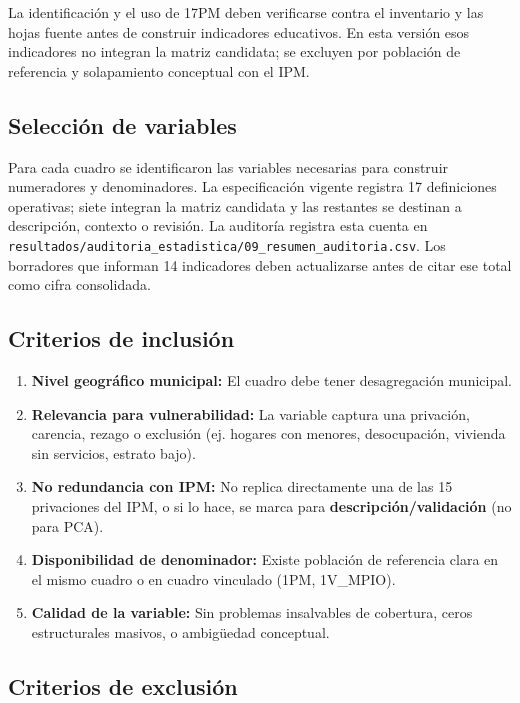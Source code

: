 \noindent * La identificación y el uso de 17PM deben verificarse contra el inventario y las hojas fuente antes de construir indicadores educativos. En esta versión esos indicadores no integran la matriz candidata; se excluyen por población de referencia y solapamiento conceptual con el IPM.

\subsection{Selección de variables}
\label{sec:seleccion_variables}

Para cada cuadro se identificaron las variables necesarias para construir numeradores y denominadores. La especificación vigente registra 17 definiciones operativas; siete integran la matriz candidata y las restantes se destinan a descripción, contexto o revisión. La auditoría registra esta cuenta en \texttt{resultados/auditoria\_estadistica/09\_resumen\_auditoria.csv}. Los borradores que informan 14 indicadores deben actualizarse antes de citar ese total como cifra consolidada.

\subsection{Criterios de inclusión}
\label{sec:criterios_inclusion}

\begin{enumerate}
    \item \textbf{Nivel geográfico municipal:} El cuadro debe tener desagregación municipal.
    \item \textbf{Relevancia para vulnerabilidad:} La variable captura una privación, carencia, rezago o exclusión (ej. hogares con menores, desocupación, vivienda sin servicios, estrato bajo).
    \item \textbf{No redundancia con IPM:} No replica directamente una de las 15 privaciones del IPM, o si lo hace, se marca para \textbf{descripción/validación} (no para PCA).
    \item \textbf{Disponibilidad de denominador:} Existe población de referencia clara en el mismo cuadro o en cuadro vinculado (1PM, 1V\_MPIO).
    \item \textbf{Calidad de la variable:} Sin problemas insalvables de cobertura, ceros estructurales masivos, o ambigüedad conceptual.
\end{enumerate}

\subsection{Criterios de exclusión}
\label{sec:criterios_exclusion}

